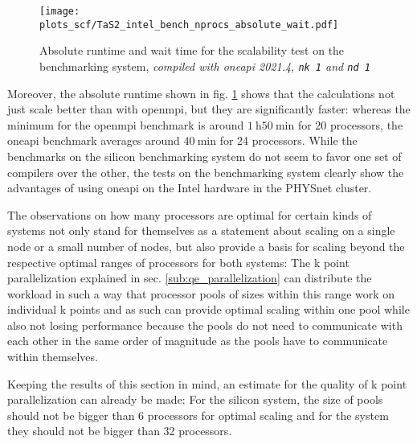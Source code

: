 \documentclass[main.tex]{subfiles}
\begin{document}
\begin{figure}[ht!]
    \centering
    \texttt{[image: plots\_scf/TaS2\_intel\_bench\_nprocs\_absolute\_wait.pdf]}

    \caption{Absolute runtime and wait time for the scalability test on the \TaS benchmarking system, \emph{\QE compiled with \gls{oneapi} 2021.4, \texttt{nk 1} and \texttt{nd 1}}}
    \label{fig:scaling_scf_intel_nprocs_tas2_absolute_wait}
\end{figure}
Moreover, the absolute runtime shown in fig. \ref{fig:scaling_scf_intel_nprocs_tas2_absolute_wait} shows that the calculations not just scale better than with \gls{openmpi}, but they are significantly faster: whereas the minimum for the \gls{openmpi} benchmark is around \(\SI{1}{\hour} \SI{50}{\minute}\) for 20 processors, the \gls{oneapi} benchmark averages around \(\SI{40}{\minute}\) for 24 processors.
While the benchmarks on the silicon benchmarking system do not seem to favor one set of compilers over the other, the tests on the \TaS benchmarking system clearly show the advantages of using \gls{oneapi} on the Intel hardware in the PHYSnet cluster.

The observations on how many processors are optimal for certain kinds of systems not only stand for themselves as a statement about scaling on a single node or a small number of nodes, but also provide a basis for scaling beyond the respective optimal ranges of processors for both systems:
The k point parallelization explained in sec. \ref{sub:qe_parallelization} can distribute the workload in such a way that processor pools of sizes within this range work on individual k points and as such can provide optimal scaling within one pool while also not losing performance because the pools do not need to communicate with each other in the same order of magnitude as the pools have to communicate within themselves.

Keeping the results of this section in mind, an estimate for the quality of k point parallelization can already be made:
For the silicon system, the size of pools should not be bigger than 6 processors for optimal scaling and for the \TaS system they should not be bigger than 32 processors.
\end{document}

